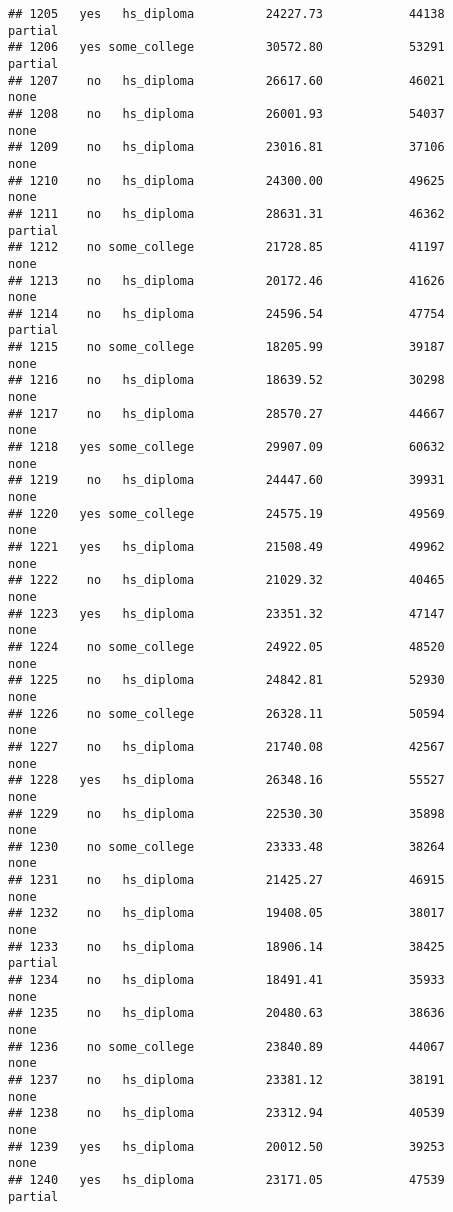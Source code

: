 \documentclass[
]{article}
\begin{document}
\begin{verbatim}
## 1205   yes   hs_diploma          24227.73            44138     partial
## 1206   yes some_college          30572.80            53291     partial
## 1207    no   hs_diploma          26617.60            46021        none
## 1208    no   hs_diploma          26001.93            54037        none
## 1209    no   hs_diploma          23016.81            37106        none
## 1210    no   hs_diploma          24300.00            49625        none
## 1211    no   hs_diploma          28631.31            46362     partial
## 1212    no some_college          21728.85            41197        none
## 1213    no   hs_diploma          20172.46            41626        none
## 1214    no   hs_diploma          24596.54            47754     partial
## 1215    no some_college          18205.99            39187        none
## 1216    no   hs_diploma          18639.52            30298        none
## 1217    no   hs_diploma          28570.27            44667        none
## 1218   yes some_college          29907.09            60632        none
## 1219    no   hs_diploma          24447.60            39931        none
## 1220   yes some_college          24575.19            49569        none
## 1221   yes   hs_diploma          21508.49            49962        none
## 1222    no   hs_diploma          21029.32            40465        none
## 1223   yes   hs_diploma          23351.32            47147        none
## 1224    no some_college          24922.05            48520        none
## 1225    no   hs_diploma          24842.81            52930        none
## 1226    no some_college          26328.11            50594        none
## 1227    no   hs_diploma          21740.08            42567        none
## 1228   yes   hs_diploma          26348.16            55527        none
## 1229    no   hs_diploma          22530.30            35898        none
## 1230    no some_college          23333.48            38264        none
## 1231    no   hs_diploma          21425.27            46915        none
## 1232    no   hs_diploma          19408.05            38017        none
## 1233    no   hs_diploma          18906.14            38425     partial
## 1234    no   hs_diploma          18491.41            35933        none
## 1235    no   hs_diploma          20480.63            38636        none
## 1236    no some_college          23840.89            44067        none
## 1237    no   hs_diploma          23381.12            38191        none
## 1238    no   hs_diploma          23312.94            40539        none
## 1239   yes   hs_diploma          20012.50            39253        none
## 1240   yes   hs_diploma          23171.05            47539     partial

\end{verbatim}
\end{document}
